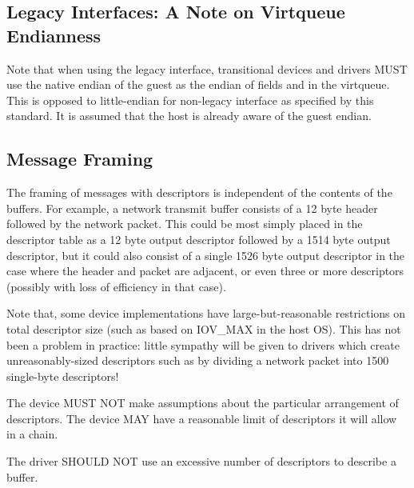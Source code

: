 \subsection{Legacy Interfaces: A Note on Virtqueue Endianness}\label{sec:Basic Facilities of a Virtio Device / Virtqueues / Legacy Interfaces: A Note on Virtqueue Endianness}

Note that when using the legacy interface, transitional
devices and drivers MUST use the native
endian of the guest as the endian of fields and in the virtqueue.
This is opposed to little-endian for non-legacy interface as
specified by this standard.
It is assumed that the host is already aware of the guest endian.

\subsection{Message Framing}\label{sec:Basic Facilities of a Virtio Device / Virtqueues / Message Framing}
The framing of messages with descriptors is
independent of the contents of the buffers. For example, a network
transmit buffer consists of a 12 byte header followed by the network
packet. This could be most simply placed in the descriptor table as a
12 byte output descriptor followed by a 1514 byte output descriptor,
but it could also consist of a single 1526 byte output descriptor in
the case where the header and packet are adjacent, or even three or
more descriptors (possibly with loss of efficiency in that case).

Note that, some device implementations have large-but-reasonable
restrictions on total descriptor size (such as based on IOV_MAX in the
host OS). This has not been a problem in practice: little sympathy
will be given to drivers which create unreasonably-sized descriptors
such as by dividing a network packet into 1500 single-byte
descriptors!

The device MUST NOT make assumptions about the particular arrangement
of descriptors.  The device MAY have a reasonable limit of descriptors
it will allow in a chain.

The driver SHOULD NOT use an excessive number of descriptors to
describe a buffer.

